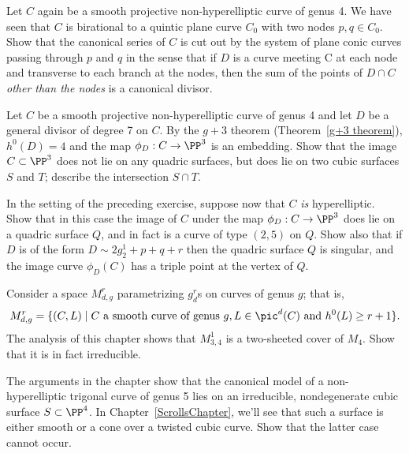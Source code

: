 \begin{exercise}\label{ex7.2}
Let $C$ again be a smooth projective non-hyperelliptic curve of genus 4. We have seen that $C$ is birational to a quintic plane curve $C_0$ with two nodes $p, q \in C_0$. Show that the canonical series of $C$ is cut out by the system of plane conic curves passing through $p$ and $q$ in the sense
that if $D$ is a curve meeting C at each node and transverse to each branch at the nodes, then
the sum of the points of $D\cap C$ \emph{other than the nodes} is a canonical divisor.
\end{exercise}

\begin{exercise}\label{ex7.3}
Let $C$  be a smooth projective non-hyperelliptic curve of genus 4 and let $D$ be a general divisor of degree 7 on $C$. By the $g+3$ theorem (Theorem~\ref{g+3 theorem}), $h^0(D) = 4$ and the map $\phi_D : C \to \PP^3$ is an embedding. Show that the image $C \subset \PP^3$ does not lie on any quadric surfaces, but does lie on two cubic surfaces $S$ and $T$; describe the intersection $S \cap T$.
\end{exercise}

\begin{exercise}\label{ex7.4}
In the setting of the preceding exercise, suppose now that $C$ \emph{is} hyperelliptic. Show that in this case the image of $C$ under the map $\phi_D : C \to \PP^3$ does lie on a quadric surface $Q$, and in fact is a curve of type $(2,5)$ on $Q$. Show also that if $D$ is of the form $D \sim 2g^1_2 + p + q + r$ then the quadric surface $Q$ is singular, and the image curve $\phi_D(C)$ has a triple point at the vertex of $Q$.
 \end{exercise}

\begin{exercise}\label{ex7.5}
Consider a space $M^r_{d,g}$ parametrizing $g^r_d$s on curves of genus $g$; that is,
$$
M^r_{d,g} = \{ (C, L) \mid C \text{ a smooth curve of genus } g, L \in \pic^d(C) \text{ and } h^0(L) \geq r+1 \}.
$$
The analysis of this chapter shows that $M^1_{3,4}$ is a two-sheeted cover of $M_4$. Show that it is in fact irreducible.
\end{exercise}

\begin{exercise}\label{ex7.6}
The arguments in the chapter show that the canonical model of a non-hyperelliptic trigonal curve of genus 5 lies on an irreducible, nondegenerate cubic surface $S \subset \PP^4$. In Chapter~\ref{ScrollsChapter}, we'll see that such a surface is either smooth or a cone over a twisted cubic curve. Show that the latter case cannot occur. 
\end{exercise}

